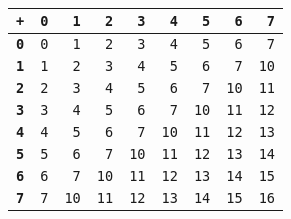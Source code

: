 \begin{tabular}{rrrrrrrrr}
\toprule
\textbf{\texttt{+}}& \textbf{\texttt{0}}& \textbf{\texttt{1}}& \textbf{\texttt{2}}& \textbf{\texttt{3}}& \textbf{\texttt{4}}& \textbf{\texttt{5}}& \textbf{\texttt{6}}& \textbf{\texttt{7}}\\ \midrule
\textbf{\texttt{0}} & \texttt{0} & \texttt{1} & \texttt{2} & \texttt{3} & \texttt{4} & \texttt{5} & \texttt{6} & \texttt{7}\\
\textbf{\texttt{1}} & \texttt{1} & \texttt{2} & \texttt{3} & \texttt{4} & \texttt{5} & \texttt{6} & \texttt{7} & \texttt{10}\\
\textbf{\texttt{2}} & \texttt{2} & \texttt{3} & \texttt{4} & \texttt{5} & \texttt{6} & \texttt{7} & \texttt{10} & \texttt{11}\\
\textbf{\texttt{3}} & \texttt{3} & \texttt{4} & \texttt{5} & \texttt{6} & \texttt{7} & \texttt{10} & \texttt{11} & \texttt{12}\\
\textbf{\texttt{4}} & \texttt{4} & \texttt{5} & \texttt{6} & \texttt{7} & \texttt{10} & \texttt{11} & \texttt{12} & \texttt{13}\\
\textbf{\texttt{5}} & \texttt{5} & \texttt{6} & \texttt{7} & \texttt{10} & \texttt{11} & \texttt{12} & \texttt{13} & \texttt{14}\\
\textbf{\texttt{6}} & \texttt{6} & \texttt{7} & \texttt{10} & \texttt{11} & \texttt{12} & \texttt{13} & \texttt{14} & \texttt{15}\\
\textbf{\texttt{7}} & \texttt{7} & \texttt{10} & \texttt{11} & \texttt{12} & \texttt{13} & \texttt{14} & \texttt{15} & \texttt{16}\\
\bottomrule
\end{tabular}
